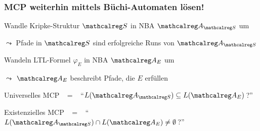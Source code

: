     \begin{frame}
      \frametitle{MCP weiterhin mittels Büchi-Automaten lösen!}

      \par\smallskip
      \begin{Itemize}
        \item
          Wandle Kripke-Struktur $\calS$ in NBA $\Aut{A}_{\calS}$ um
          \par\smallskip
          $\leadsto$ Pfade in $\calS$ sind erfolgreiche Runs von $\Aut{A}_{\calS}$
          \par\bigskip
        \item<2->
          Wandeln LTL-Formel $\varphi_E$ in NBA $\Aut{A}_E$ um
          \par\smallskip
          $\leadsto$ $\Aut{A}_E$ beschreibt Pfade, die $E$ erfüllen
          \par\bigskip
        \item<3->[$\leadsto$]
          Universelles MCP ~$=$~ "`$L(\Aut{A}_{\calS}) \subseteq L(\Aut{A}_E)$\,?"'
          \par\smallskip
          Existenzielles MCP ~$=$~ "`$L(\Aut{A}_{\calS}) \cap L(\Aut{A}_E) \neq \emptyset$\,?"'
      \end{Itemize}
      
      \par\bigskip

    \end{frame}

